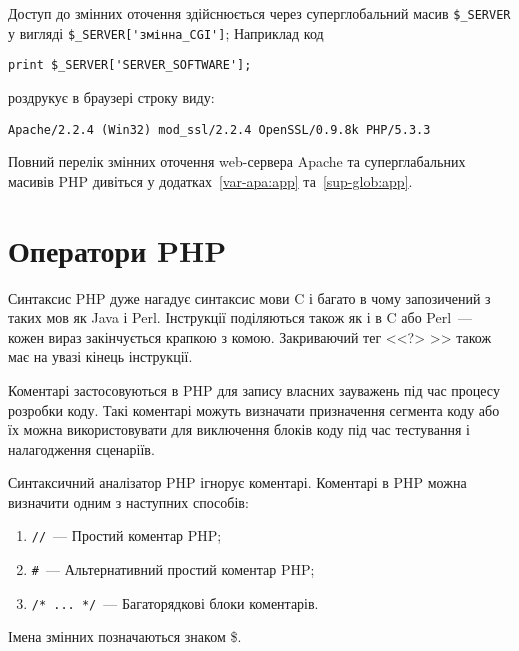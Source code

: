 Доступ до змінних оточення здійснюється через суперглобальний масив \verb'$_SERVER' у вигляді \verb|$_SERVER['змінна_CGI']|; Наприклад код
\begin{verbatim}
print $_SERVER['SERVER_SOFTWARE'];
\end{verbatim}
роздрукує в браузері строку виду:
\begin{verbatim}
Apache/2.2.4 (Win32) mod_ssl/2.2.4 OpenSSL/0.9.8k PHP/5.3.3
\end{verbatim}


Повний перелік змінних оточення web-сервера Apache та суперглабальних масивів PHP дивіться у додатках~\ref{var-apa:app} та~\ref{sup-glob:app}.


\pagebreak[3]



\section{Оператори PHP}
\nopagebreak[4]
Синтаксис PHP дуже нагадує синтаксис мови C і багато в чому запозичений з таких мов як Java і Perl. Інструкції поділяються також як і в C або Perl~--- кожен вираз закінчується крапкою з комою. Закриваючий тег <<?> >> також має на увазі кінець інструкції.

Коментарі застосовуються в PHP для запису власних зауважень під час процесу розробки коду. Такі коментарі можуть визначати призначення сегмента коду або їх можна використовувати для виключення блоків коду під час тестування і налагодження сценаріїв.

Синтаксичний аналізатор PHP ігнорує коментарі. Коментарі в PHP можна визначити одним з наступних способів:
\begin{enumerate}

\item \verb|//|~--- Простий коментар PHP;
\item \verb|#|~--- Альтернативний простий коментар PHP;
\item \verb|/* ... */|~--- Багаторядкові блоки коментарів.

\end{enumerate}
Імена змінних позначаються знаком \$.

